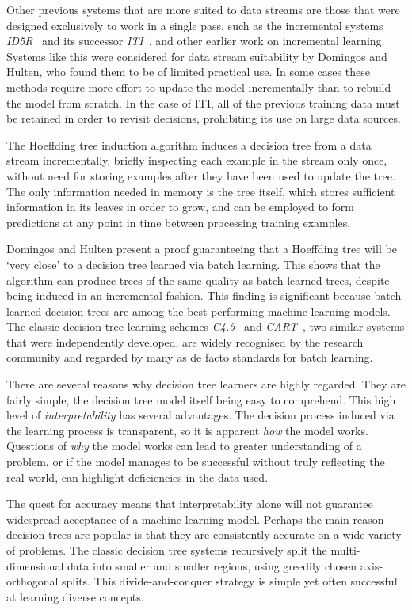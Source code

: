 Other previous systems that are more suited to data streams are those that were designed exclusively to work in a single pass, such as the incremental systems {\it ID5R}~\cite{id5r} and its successor {\it ITI}~\cite{iti}, and other earlier work on incremental learning. Systems like this were considered for data stream suitability by Domingos and Hulten, who found them to be of limited practical use. In some cases these methods require more effort to update the model incrementally than to rebuild the model from scratch. In the case of ITI, all of the previous training data must be retained in order to revisit decisions, prohibiting its use on large data sources. 

The Hoeffding tree induction algorithm induces a decision tree from a data stream incrementally, briefly inspecting each example in the stream only once, without need for storing examples after they have been used to update the tree. The only information needed in memory is the tree itself, which stores sufficient information in its leaves in order to grow, and can be employed to form predictions at any point in time between processing training examples.

Domingos and Hulten present a proof guaranteeing that a Hoeffding tree will be `very close' to a decision tree learned via batch learning. This shows that the algorithm can produce trees of the same quality as batch learned trees, despite being induced in an incremental fashion. This finding is significant because batch learned decision trees are among the best performing machine learning models.
The classic decision tree learning schemes {\em C4.5}~\cite{c4.5} and {\em CART}~\cite{cart}, two similar systems that were independently developed, are widely recognised by the research community and regarded by many as de facto standards for batch learning.

There are several reasons why decision tree learners are highly regarded. They are fairly simple, the decision tree model itself being easy to comprehend. This high level of {\it interpretability} has several advantages. The decision process induced via the learning process is transparent, so it is apparent {\it how} the model works. Questions of {\it why} the model works can lead to greater understanding of a problem, or if the model manages to be successful without truly reflecting the real world, can highlight deficiencies in the data used.

The quest for accuracy means that interpretability alone will not guarantee widespread acceptance of a machine learning model. Perhaps the main reason decision trees are popular is that they are consistently accurate on a wide variety of problems. The classic decision tree systems recursively split the multi-dimensional data into smaller and smaller regions, using greedily chosen axis-orthogonal splits. This divide-and-conquer strategy is simple yet often successful at learning diverse concepts.

